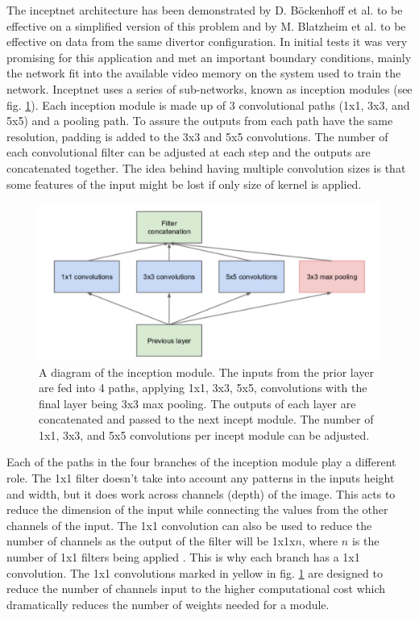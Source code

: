 \label{sec:code:inceptnet}

The inceptnet architecture \cite{https://doi.org/10.48550/arxiv.1409.4842} has been demonstrated by D. Böckenhoff et al. \cite{Böckenhoff_2019} to be effective on a simplified version of this problem and by M. Blatzheim et al. \cite{Blatzheim_2019} to be effective on data from the same divertor configuration. In initial tests it was very promising for this application and met an important boundary conditions, mainly the network fit into the available video memory on the system used to train the network. Inceptnet uses a series of sub-networks, known as inception modules (see fig. \ref{fig:code:inceptmodule}). Each inception module is made up of 3 convolutional paths (1x1, 3x3, and 5x5) and a pooling path. To assure the outputs from each path have the same resolution, padding is added to the 3x3 and 5x5 convolutions. The number of each convolutional filter can be adjusted at each step and the outputs are concatenated together. The idea behind having multiple convolution sizes is that some features of the input might be lost if only size of kernel is applied.

\begin{figure}[htb]
    \includegraphics[width=\textwidth]{images/incept-simple.png}
    \caption{A diagram of the inception module. The inputs from the prior layer are fed into 4 paths, applying 1x1, 3x3, 5x5, convolutions with the final layer being 3x3 max pooling. The outputs of each layer are concatenated and passed to the next incept module. The number of 1x1, 3x3, and 5x5 convolutions per incept module can be adjusted.}
    \label{fig:code:inceptmodule}
\end{figure}

Each of the paths in the four branches of the inception module play a different role. The 1x1 filter doesn't take into account any patterns in the inputs height and width, but it does work across channels (depth) of the image. This acts to reduce the dimension of the input while connecting the values from the other channels of the input. The 1x1 convolution can also be used to reduce the number of channels as the output of the filter will be 1x1x$n$, where $n$ is the number of 1x1 filters being applied \cite{https://doi.org/10.48550/arxiv.1312.4400}. This is why each branch has a 1x1 convolution. The 1x1 convolutions marked in yellow in fig. \ref{fig:code:inceptmodule} are designed to reduce the number of channels input to the higher computational cost which dramatically reduces the number of weights needed for a module.

